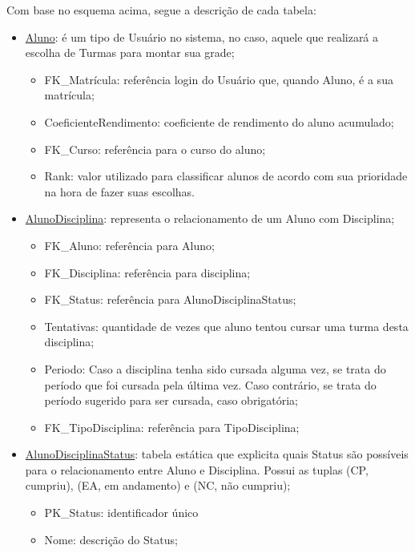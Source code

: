 \documentclass[graduacao,brazil]{ThesisPUC}
\begin{document}
Com base no esquema acima, segue a descrição de cada tabela:

\begin{itemize}

	\item \underline{Aluno}: é um tipo de Usuário no sistema, no caso, aquele que realizará a escolha de Turmas para montar sua grade;
	\begin{itemize}
		\item FK\_Matrícula: referência login do Usuário que, quando Aluno, é a sua matrícula;
		\item CoeficienteRendimento: coeficiente de rendimento do aluno acumulado;
		\item FK\_Curso: referência para o curso do aluno;
		\item Rank: valor utilizado para classificar alunos de acordo com sua prioridade na hora de fazer suas escolhas.
	\end{itemize}

	\item \underline{AlunoDisciplina}: representa o relacionamento de um Aluno com Disciplina;
	\begin{itemize}
		\item FK\_Aluno: referência para Aluno;
		\item FK\_Disciplina: referência para disciplina;
		\item FK\_Status: referência para AlunoDisciplinaStatus;
		\item Tentativas: quantidade de vezes que aluno tentou cursar uma turma desta disciplina;
		\item Periodo: Caso a disciplina tenha sido cursada alguma vez, se trata do período que foi cursada pela última vez. Caso contrário, se trata do período sugerido para ser cursada, caso obrigatória;
		\item FK\_TipoDisciplina: referência para TipoDisciplina;
	\end{itemize}

	\item \underline{AlunoDisciplinaStatus}: tabela estática que explicita quais Status são possíveis para o relacionamento entre Aluno e Disciplina. Possui as tuplas (CP, cumpriu), (EA, em andamento) e (NC, não cumpriu);
	\begin{itemize}
		\item PK\_Status: identificador único
		\item Nome: descrição do Status;
	\end{itemize}


\end{itemize}
\end{document}
